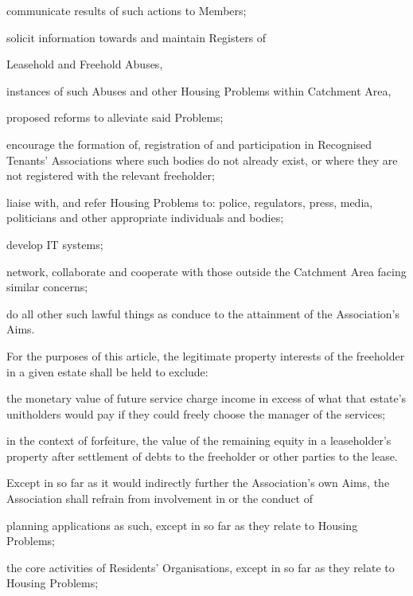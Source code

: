 \documentclass[10pt]{mk-articles-of-association}
\newcommand{\RA}[0]{Residents' Organisation}
\newcommand{\RTA}[0]{Recognised Tenants' Association}
\newcommand{\LAFA}[0]{Leasehold and Freehold Abuses}
\begin{document}
\begin{constenum}
\begin{constenum}
  \item communicate results of such actions to Members;

  \item solicit information towards and maintain Registers of
    \begin{constenum}
    \item \LAFA, \ITand
    \item instances of such Abuses and other Housing Problems within
      Catchment Area,
    \item proposed reforms to alleviate said Problems;
    \end{constenum}

  \item encourage the formation of, registration of and participation
    in \RTA{}s where such bodies do not already exist, or where they
    are not registered with the relevant freeholder;

  \item liaise with, and refer Housing Problems to: police, regulators,
    press, media, politicians and other appropriate individuals and bodies;

  \item develop IT systems;

  \item network, collaborate and cooperate with those outside the
    Catchment Area facing similar concerns;

  \item do all other such lawful things as conduce to the attainment
    of the Association's Aims.
\end{constenum}

\item For the purposes of this article, the legitimate property interests of
  the freeholder in a given estate shall be held to exclude:
  \begin{constenum}
    \item the monetary value of future service charge income in excess of what
      that estate's unitholders would pay if they could freely choose the
      manager of the services; \ITand
    \item in the context of forfeiture, the value of the remaining equity in a
      leaseholder's property after settlement of debts to the freeholder or
      other parties to the lease.
  \end{constenum}

\item Except in so far as it would indirectly further the Association's own
  Aims, the Association shall refrain from involvement in or the conduct of
  \begin{constenum}
  \item planning applications as such, except in so far as they relate
    to Housing Problems;
  \item the core activities of \RA{}s, except in so far as they
    relate to Housing Problems;
  \end{constenum}


\end{constenum}
\end{document}
